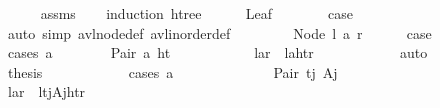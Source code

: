 \begin{isabellebody}
%
\isadelimproof
\ \ \ \ %
\endisadelimproof
%
\isatagproof
{}\isamarkupfalse%
\ assms\isanewline
\ \ \isamarkupfalse%
\ {\isacharparenleft}{\kern0pt}induction\ htree{\isacharparenright}{\kern0pt}\isanewline
\ \ \ \ \isamarkupfalse%
\ Leaf\isanewline
\ \ \ \ \isamarkupfalse%
\ \isamarkupfalse%
\ {\isacharquery}{\kern0pt}case\isanewline
\ \ \ \ \ \ \isamarkupfalse%
\ {\isacharparenleft}{\kern0pt}auto\ simp{\isacharcolon}{\kern0pt}\ avl{\isacharunderscore}{\kern0pt}node{\isacharunderscore}{\kern0pt}def\ avl{\isacharunderscore}{\kern0pt}inorder{\isacharunderscore}{\kern0pt}def{\isacharparenright}{\kern0pt}\isanewline
\ \ \isamarkupfalse%
\isanewline
\ \ \ \ \isamarkupfalse%
\ {\isacharparenleft}{\kern0pt}Node\ l\ a\ r{\isacharparenright}{\kern0pt}\isanewline
\ \ \ \ \isamarkupfalse%
\ {\isacharquery}{\kern0pt}case\ \isanewline
\ \ \ \ \isamarkupfalse%
\ {\isacharparenleft}{\kern0pt}cases\ a{\isacharparenright}{\kern0pt}\isanewline
\ \ \ \ \ \ \isamarkupfalse%
\ {\isacharparenleft}{\kern0pt}Pair\ a{\isacharprime}{\kern0pt}\ ht{\isacharparenright}{\kern0pt}\isanewline
\ \ \ \ \ \ \ \ \isamarkupfalse%
\ \isamarkupfalse%
\ {\isachardoublequoteopen}{\isasymlangle}l{\isacharcomma}{\kern0pt}a{\isacharcomma}{\kern0pt}r{\isasymrangle}\ {\isacharequal}{\kern0pt}\ {\isasymlangle}l{\isacharcomma}{\kern0pt}{\isacharparenleft}{\kern0pt}a{\isacharprime}{\kern0pt}{\isacharcomma}{\kern0pt}ht{\isacharparenright}{\kern0pt}{\isacharcomma}{\kern0pt}r{\isasymrangle}{\isachardoublequoteclose}\isanewline
\ \ \ \ \ \ \ \ \ \ \isamarkupfalse%
\ auto\isanewline
\ \ \ \ \ \ \ \ \isamarkupfalse%
\ {\isacharquery}{\kern0pt}thesis\isanewline
\ \ \ \ \ \ \ \ \ \ \isamarkupfalse%
\ {\isacharparenleft}{\kern0pt}cases\ a{\isacharprime}{\kern0pt}{\isacharparenright}{\kern0pt}\isanewline
\ \ \ \ \ \ \ \ \ \ \ \ \isamarkupfalse%
\ {\isacharparenleft}{\kern0pt}Pair\ t\isactrlsub j\ A\isactrlsub j{\isacharparenright}{\kern0pt}\isanewline
\ \ \ \ \ \ \ \ \ \ \ \ \isamarkupfalse%
\ \isamarkupfalse%
\ {\isachardoublequoteopen}{\isasymlangle}l{\isacharcomma}{\kern0pt}a{\isacharcomma}{\kern0pt}r{\isasymrangle}\ {\isacharequal}{\kern0pt}\ {\isasymlangle}l{\isacharcomma}{\kern0pt}{\isacharparenleft}{\kern0pt}{\isacharparenleft}{\kern0pt}t\isactrlsub j{\isacharcomma}{\kern0pt}A\isactrlsub j{\isacharparenright}{\kern0pt}{\isacharcomma}{\kern0pt}ht{\isacharparenright}{\kern0pt}{\isacharcomma}{\kern0pt}r{\isasymrangle}{\isachardoublequoteclose}\isanewline

\end{isabellebody}
